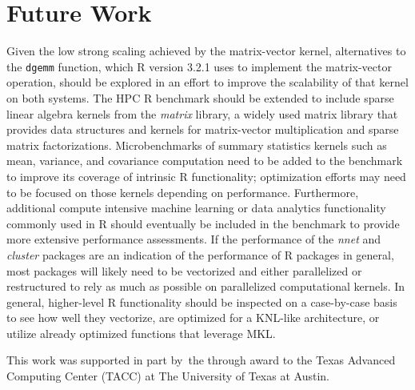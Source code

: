 \section{Future Work} \label{sec:future}
Given the low strong scaling achieved by the matrix-vector kernel, alternatives
  to the \texttt{dgemm} function, which R version 3.2.1 uses to implement the
  matrix-vector operation, should be explored in an effort to improve the
  scalability of that kernel on both systems.
The HPC R benchmark should be extended to include sparse linear algebra kernels from
  the \textit{matrix} library, a widely used matrix library that provides
  data structures and kernels for matrix-vector multiplication and sparse
  matrix factorizations.
Microbenchmarks of summary statistics kernels such as mean, variance, and
  covariance computation need to be added to the benchmark to improve its
  coverage of intrinsic R functionality; optimization efforts may need to be
  focused on those kernels depending on performance.
Furthermore, additional compute intensive machine learning or data analytics
  functionality commonly used in R should eventually be included in the
  benchmark to provide more extensive performance assessments.
If the performance of the \textit{nnet} and \textit{cluster} packages are an
  indication of the performance of R packages in general, most packages will
  likely need to be vectorized and either parallelized or restructured to rely
  as much as possible on parallelized computational kernels.
In general, higher-level R functionality should be inspected on a case-by-case
  basis to see how well they vectorize, are optimized for a KNL-like
  architecture, or utilize already optimized functions that leverage MKL.

\begin{acks}
This work was supported in part by the  through award  to the Texas Advanced Computing Center (TACC) at The University of Texas at Austin.
\end{acks}



